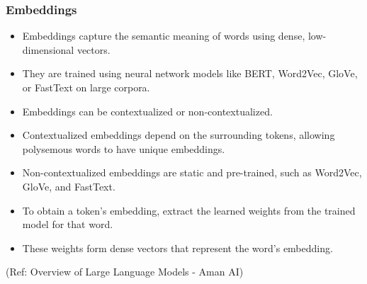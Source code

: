 \begin{frame}[fragile]\frametitle{Embeddings}


\begin{itemize}
\item Embeddings capture the semantic meaning of words using dense, low-dimensional vectors.
\item They are trained using neural network models like BERT, Word2Vec, GloVe, or FastText on large corpora.
\item Embeddings can be contextualized or non-contextualized.
\item Contextualized embeddings depend on the surrounding tokens, allowing polysemous words to have unique embeddings.
\item Non-contextualized embeddings are static and pre-trained, such as Word2Vec, GloVe, and FastText.
\item To obtain a token's embedding, extract the learned weights from the trained model for that word.
\item These weights form dense vectors that represent the word's embedding.
\end{itemize}

				
{\tiny (Ref: Overview of Large Language Models - Aman AI)}

\end{frame}

